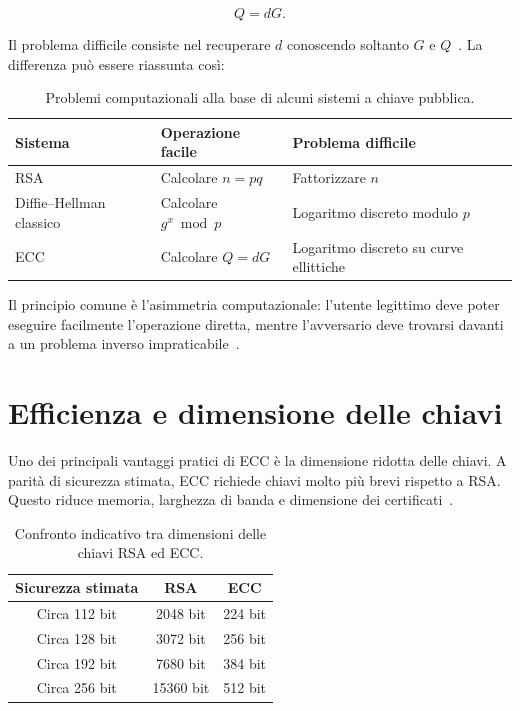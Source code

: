 \documentclass[12pt,a4paper,oneside]{report}
\begin{document}
\[
Q=dG.
\]

Il problema difficile consiste nel recuperare \(d\) conoscendo soltanto \(G\) e \(Q\)~\cite{margara_ec,sec1}. La differenza può essere riassunta così:

\begin{table}[H]
\centering
\begin{tabular}{lll}
\toprule
\textbf{Sistema} & \textbf{Operazione facile} & \textbf{Problema difficile} \\
\midrule
RSA & Calcolare \(n=pq\) & Fattorizzare \(n\) \\
Diffie--Hellman classico & Calcolare \(g^x \bmod p\) & Logaritmo discreto modulo \(p\) \\
ECC & Calcolare \(Q=dG\) & Logaritmo discreto su curve ellittiche \\
\bottomrule
\end{tabular}
\caption{Problemi computazionali alla base di alcuni sistemi a chiave pubblica.}
\label{tab:rsa-dh-ecc}
\end{table}

Il principio comune è l'asimmetria computazionale: l'utente legittimo deve poter eseguire facilmente l'operazione diretta, mentre l'avversario deve trovarsi davanti a un problema inverso impraticabile~\cite{margara_rsa,margara_dh,margara_ec}.

\section{Efficienza e dimensione delle chiavi}

Uno dei principali vantaggi pratici di ECC è la dimensione ridotta delle chiavi. A parità di sicurezza stimata, ECC richiede chiavi molto più brevi rispetto a RSA. Questo riduce memoria, larghezza di banda e dimensione dei certificati~\cite{nist_sp800_57,sec1}.

\begin{table}[h]
\centering
\begin{tabular}{ccc}
\toprule
\textbf{Sicurezza stimata} & \textbf{RSA} & \textbf{ECC} \\
\midrule
Circa 112 bit & 2048 bit & 224 bit \\
Circa 128 bit & 3072 bit & 256 bit \\
Circa 192 bit & 7680 bit & 384 bit \\
Circa 256 bit & 15360 bit & 512 bit \\
\bottomrule
\end{tabular}
\caption{Confronto indicativo tra dimensioni delle chiavi RSA ed ECC.}
\label{tab:key-size-comparison}
\end{table}
\end{document}
